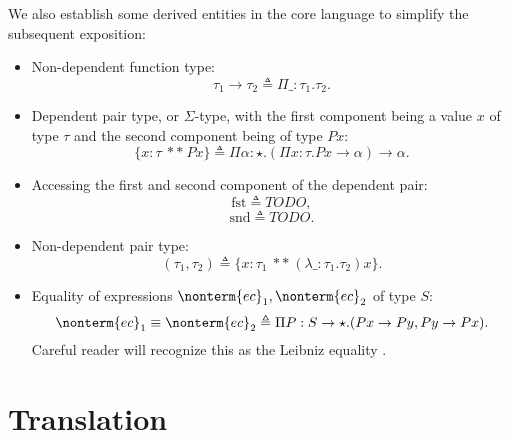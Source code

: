 \documentclass[a4paper]{article}
\begin{document}
We also establish some derived entities in the core language to simplify the subsequent exposition:

\begin{itemize}
  \item Non-dependent function type:
    \[
      \tau_1 \rightarrow \tau_2 \triangleq \Pi \_ : \tau_1. \tau_2.
    \]
  \item Dependent pair type, or $\Sigma$-type, with the first component being a value $x$ of type $\tau$ and the second component being of type $P x$:
    \[
      \{ x : \tau\ **\ P x \} \triangleq \Pi \alpha : \star. (\Pi x : \tau. P x \rightarrow \alpha) \rightarrow \alpha.
    \]
  \item Accessing the first and second component of the dependent pair:
    \[
      \text{fst} \triangleq TODO,
    \]
    \[
      \text{snd} \triangleq TODO.
    \]
  \item Non-dependent pair type:
    \[
      (\tau_1, \tau_2) \triangleq \{ x : \tau_1\ **\ (\lambda \_ : \tau_1. \tau_2) x \}.
    \]
  \item Equality of expressions $\nonterm{ec}_1, \nonterm{ec}_2$ of type $S$:
    \[
      \nonterm{ec}_1 \equiv \nonterm{ec}_2 \triangleq \Pi P : S \rightarrow \star. (P x \rightarrow P y, P y \rightarrow P x).
    \]
    Careful reader will recognize this as the Leibniz equality \cite{FindSomethingForThis}.
\end{itemize}

\section{Translation}
\end{document}
